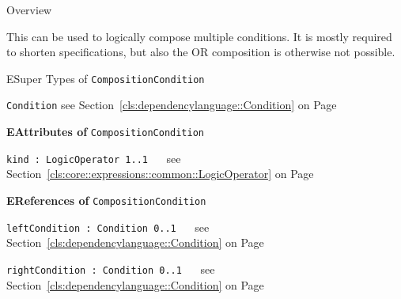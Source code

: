 	\begin{longdescription}
		\item[Overview] 		
				

	

		This can be used to logically compose multiple conditions.
It is mostly required to shorten specifications, but also the OR composition is otherwise not possible.		
		\item[ESuper Types of \texttt{CompositionCondition}] ~
			\begin{longdescription}
				\item[\texttt{Condition}] see Section~\ref{cls:dependencylanguage::Condition} on Page~\pageref{cls:dependencylanguage::Condition}						\end{longdescription}
		
	
			\item[\textbf{EAttributes of} \texttt{CompositionCondition}] ~
			\begin{longdescription}
	\item[\texttt{kind : LogicOperator \symbol{"5B}1..1\symbol{"5D}
}] ~
	see Section~\ref{cls:core::expressions::common::LogicOperator} on Page~\pageref{cls:core::expressions::common::LogicOperator}
	
	\nopagebreak
		
				

	

	
			\end{longdescription}
			\item[\textbf{EReferences of} \texttt{CompositionCondition}] ~
			\begin{longdescription}
	\item[\texttt{leftCondition : Condition \symbol{"5B}0..1\symbol{"5D}
}] ~
	see Section~\ref{cls:dependencylanguage::Condition} on Page~\pageref{cls:dependencylanguage::Condition}
	
	\nopagebreak
		
				

	

	
	\item[\texttt{rightCondition : Condition \symbol{"5B}0..1\symbol{"5D}
}] ~
	see Section~\ref{cls:dependencylanguage::Condition} on Page~\pageref{cls:dependencylanguage::Condition}
	
	\nopagebreak
		
				

	

	
			\end{longdescription}
	
	\end{longdescription}
	

